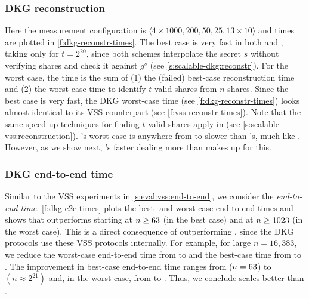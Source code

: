 \subsubsection{DKG reconstruction}
\label{s:eval:dkg:reconstr}
Here the measurement configuration is $\langle 4\times 1000, 200, 50, 25, 13\times 10\rangle$ and times are plotted in \cref{f:dkg-reconstr-times}.
The best case is very fast in both \ejfdkg and \ourdkg, taking only  for $t=2^{20}$, since both schemes interpolate the secret $s$ without verifying shares and check it against $g^s$ (see \cref{s:scalable-dkg:reconstr}).
For the worst case, the time is the sum of (1) the (failed) best-case reconstruction time and (2) the worst-case time to identify $t$ valid shares from $n$ shares.
Since the best case is very fast, the DKG worst-case time (see \cref{f:dkg-reconstr-times}) looks almost identical to its VSS counterpart (see \cref{f:vss-reconstr-times}).
Note that the same \ourvss speed-up techniques for finding $t$ valid shares apply in \ourdkg (see \cref{s:scalable-vss:reconstruction}).
\ourdkg's worst case is anywhere from  to  slower than \ejfdkg's, much like \ourvss.
However, as we show next, \ourdkg's faster dealing more than makes up for this.

\subsubsection{DKG end-to-end time}
\label{s:eval:dkg:e2e-time}

Similar to the VSS experiments in \cref{s:eval:vss:end-to-end}, we consider the \textit{end-to-end time}.
\cref{f:dkg-e2e-times} plots the best- and worst-case end-to-end times and shows that \ourdkg outperforms \ejfdkg starting at $n\ge 63$ (in the best case) and at $n\ge1023$ (in the worst case).
This is a direct consequence of \ourvss outperforming \evss, since the DKG protocols use these VSS protocols internally.
For example, for large $n=16,383$, we reduce the worst-case end-to-end time from  to  and the best-case time from  to .
The improvement in best-case end-to-end time ranges from \amtDkgEndToEndBcTimeImprovOverejf{\dkgOutperformBcN} ($n=63$) to  $(n\approx2^{21})$ and, in the worst case, from \amtDkgEndToEndWcTimeImprovOverejf{\dkgOutperformWcN} to .
Thus, we conclude \ourdkg scales better than \ejfdkg.

